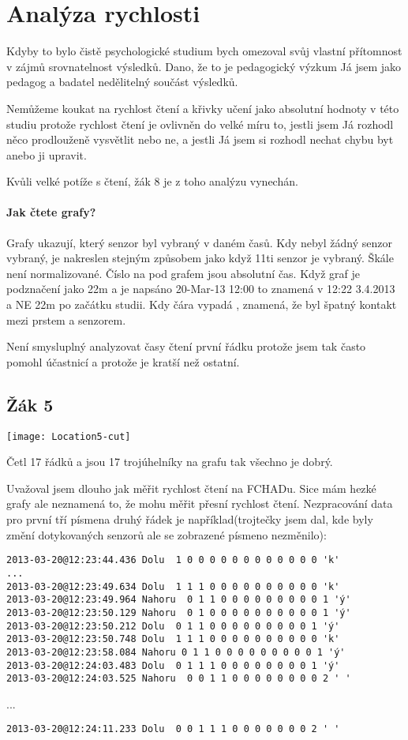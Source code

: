 \section{Analýza rychlosti}
Kdyby to bylo čistě psychologické studium bych omezoval svůj vlastní přítomnost v zájmů srovnatelnost výsledků.  Dano, že to je pedagogický výzkum Já jsem jako pedagog a badatel nedělitelný součást výsledků.

Nemůžeme koukat na rychlost čtení a křivky učení jako absolutní hodnoty v této studiu protože rychlost čtení je ovlivněn do velké míru to, jestli jsem Já rozhodl něco prodlouženě vysvětlit nebo ne, a jestli Já jsem si rozhodl nechat chybu byt anebo ji upravit.

Kvůli velké potíže s čtení, žák 8 je z toho analýzu vynechán.

\paragraph{Jak čtete grafy?}  Grafy ukazují, který senzor byl vybraný v daném časů.  Kdy nebyl žádný senzor vybraný, je nakreslen stejným způsobem jako když 11ti senzor je vybraný.  Škále není normalizované. Číslo na pod grafem jsou absolutní čas.  Když graf je podznačení jako 22m a je napsáno 20-Mar-13 12:00 to znamená v 12:22 3.4.2013 a NE 22m po začátku studii.  Kdy čára vypadá , znamená, že byl špatný kontakt mezi prstem a senzorem.

Není smysluplný analyzovat časy čtení první řádku protože jsem tak často pomohl účastnicí a protože je kratší než ostatní.


\subsection{Žák 5}
\texttt{[image: Location5-cut]}

Četl 17 řádků a jsou 17 trojúhelníky na grafu tak všechno je dobrý.

Uvažoval jsem dlouho jak měřit rychlost čtení na FCHADu.  Sice mám hezké grafy ale neznamená to, že mohu měřit přesní rychlost čtení.  Nezpracování data pro první tří písmena druhý řádek je například(trojtečky jsem dal, kde byly změní dotykovaných senzorů ale se zobrazené písmeno nezměnilo):
\begin{verbatim}
2013-03-20@12:23:44.436 Dolu  1 0 0 0 0 0 0 0 0 0 0 0 0 'k'
...
2013-03-20@12:23:49.634 Dolu  1 1 1 0 0 0 0 0 0 0 0 0 0 'k'
2013-03-20@12:23:49.964 Nahoru  0 1 1 0 0 0 0 0 0 0 0 0 1 'ý'
2013-03-20@12:23:50.129 Nahoru  0 1 0 0 0 0 0 0 0 0 0 0 1 'ý'
2013-03-20@12:23:50.212 Dolu  0 1 1 0 0 0 0 0 0 0 0 0 1 'ý'
2013-03-20@12:23:50.748 Dolu  1 1 1 0 0 0 0 0 0 0 0 0 0 'k'
2013-03-20@12:23:58.084 Nahoru 0 1 1 0 0 0 0 0 0 0 0 0 1 'ý'
2013-03-20@12:24:03.483 Dolu  0 1 1 1 0 0 0 0 0 0 0 0 1 'ý'
2013-03-20@12:24:03.525 Nahoru  0 0 1 1 0 0 0 0 0 0 0 0 2 ' '
\end{verbatim}
...
\begin{verbatim}
2013-03-20@12:24:11.233 Dolu  0 0 1 1 1 0 0 0 0 0 0 0 2 ' '

\end{verbatim}

